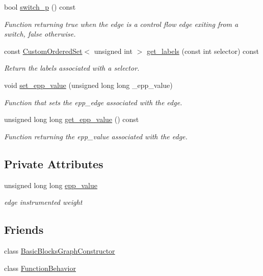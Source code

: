\begin{DoxyCompactItemize}
bool \hyperlink{structBBEdgeInfo_af2e3b55b373c466d44827066e506ee68}{switch\+\_\+p} () const
\begin{DoxyCompactList}\small\item\em Function returning true when the edge is a control flow edge exiting from a switch, false otherwise. \end{DoxyCompactList}\item 
const \hyperlink{classCustomOrderedSet}{Custom\+Ordered\+Set}$<$ unsigned int $>$ \hyperlink{structBBEdgeInfo_a2259bc2b4c16fe15f466b9817d434fdd}{get\+\_\+labels} (const int selector) const
\begin{DoxyCompactList}\small\item\em Return the labels associated with a selector. \end{DoxyCompactList}\item 
void \hyperlink{structBBEdgeInfo_a0302c7282b7118a9ee001c3f57d8c288}{set\+\_\+epp\+\_\+value} (unsigned long long \+\_\+epp\+\_\+value)
\begin{DoxyCompactList}\small\item\em Function that sets the epp\+\_\+edge associated with the edge. \end{DoxyCompactList}\item 
unsigned long long \hyperlink{structBBEdgeInfo_a4d4fe21eb77760b1fda1fbf32a55d553}{get\+\_\+epp\+\_\+value} () const
\begin{DoxyCompactList}\small\item\em Function returning the epp\+\_\+value associated with the edge. \end{DoxyCompactList}\end{DoxyCompactItemize}
\subsection*{Private Attributes}
\begin{DoxyCompactItemize}
\item 
unsigned long long \hyperlink{structBBEdgeInfo_a3cf14088ed9c7f8d05f1729ac24dc15f}{epp\+\_\+value}
\begin{DoxyCompactList}\small\item\em edge instrumented weight \end{DoxyCompactList}\end{DoxyCompactItemize}
\subsection*{Friends}
\begin{DoxyCompactItemize}
\item 
class \hyperlink{structBBEdgeInfo_a2ec16ee525628d633fa2b269c262b5af}{Basic\+Blocks\+Graph\+Constructor}
\item 
class \hyperlink{structBBEdgeInfo_af6a92c6b34ca1e8f6cd6c5a95a1f7710}{Function\+Behavior}
\end{DoxyCompactItemize}
